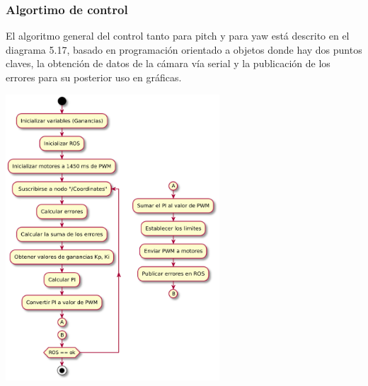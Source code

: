 \subsubsection{Algortimo de control}
El algoritmo general del control tanto para pitch y para yaw está descrito en el diagrama 5.17, basado en programación orientado a objetos
donde hay dos puntos claves, la obtención de datos de la cámara vía serial y la publicación de los errores para su posterior uso en gráficas.
\begin{center}
	\includegraphics[width=0.6\textwidth]{Contenido/Cuerpo/Capitulo5/Fig24.eps}
	\label{Fig4}
\end{center}

